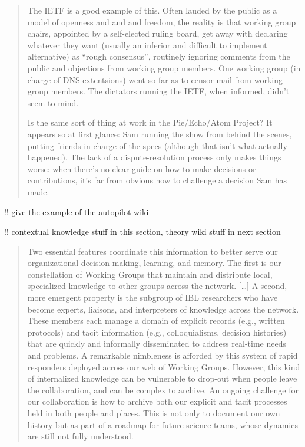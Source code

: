 \documentclass[10pt]{article}
\begin{document}
\begin{multicols}{2}
\begin{quote}
The IETF is a good example of this. Often lauded by the public as a
model of openness and and and freedom, the reality is that working group
chairs, appointed by a self-elected ruling board, get away with
declaring whatever they want (usually an inferior and difficult to
implement alternative) as ``rough consensus'', routinely ignoring
comments from the public and objections from working group members. One
working group (in charge of DNS extentsions) went so far as to censor
mail from working group members. The dictators running the IETF, when
informed, didn't seem to mind.

Is the same sort of thing at work in the Pie/Echo/Atom Project? It
appears so at first glance: Sam running the show from behind the scenes,
putting friends in charge of the specs (although that isn't what
actually happened). The lack of a dispute-resolution process only makes
things worse: when there's no clear guide on how to make decisions or
contributions, it's far from obvious how to challenge a decision Sam has
made. \cite{swartzSecretsStandards2003} 
\end{quote}

!! give the example of the autopilot wiki

!! contextual knowledge stuff in this section, theory wiki stuff in next
section

\begin{quote}
Two essential features coordinate this information to better serve our
organizational decision-making, learning, and memory. The first is our
constellation of Working Groups that maintain and distribute local,
specialized knowledge to other groups across the network. {[}\ldots{]} A
second, more emergent property is the subgroup of IBL researchers who
have become experts, liaisons, and interpreters of knowledge across the
network. These members each manage a domain of explicit records (e.g.,
written protocols) and tacit information (e.g., colloquialisms, decision
histories) that are quickly and informally disseminated to address
real-time needs and problems. A remarkable nimbleness is afforded by
this system of rapid responders deployed across our web of Working
Groups. However, this kind of internalized knowledge can be vulnerable
to drop-out when people leave the collaboration, and can be complex to
archive. An ongoing challenge for our collaboration is how to archive
both our explicit and tacit processes held in both people and places.
This is not only to document our own history but as part of a roadmap
for future science teams, whose dynamics are still not fully understood.
\cite{woolKnowledgeNetworksHow2020} 
\end{quote}


\end{multicols}
\end{document}
